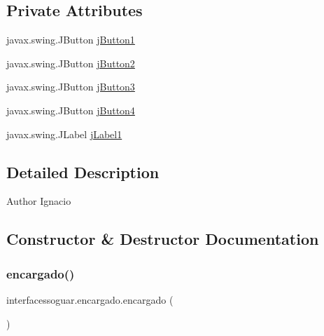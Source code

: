 \subsection*{Private Attributes}
\begin{DoxyCompactItemize}
\item 
javax.\+swing.\+J\+Button \mbox{\hyperlink{classinterfacessoguar_1_1encargado_a5c4a8d1db3281eae3c5b8f19262b20c3}{j\+Button1}}
\item 
javax.\+swing.\+J\+Button \mbox{\hyperlink{classinterfacessoguar_1_1encargado_a1f39888fb096cb2dd2e874f7e05f05b5}{j\+Button2}}
\item 
javax.\+swing.\+J\+Button \mbox{\hyperlink{classinterfacessoguar_1_1encargado_a44f99cceb2a2d736508b0249e1ad447e}{j\+Button3}}
\item 
javax.\+swing.\+J\+Button \mbox{\hyperlink{classinterfacessoguar_1_1encargado_ada21ea49d21b7b6bdd43b2a7c584450d}{j\+Button4}}
\item 
javax.\+swing.\+J\+Label \mbox{\hyperlink{classinterfacessoguar_1_1encargado_a1b1ad6a8d2b52a465c2daf3b4409c9ed}{j\+Label1}}
\end{DoxyCompactItemize}


\subsection{Detailed Description}
\begin{DoxyAuthor}{Author}
Ignacio 
\end{DoxyAuthor}


\subsection{Constructor \& Destructor Documentation}
\mbox{\label{classinterfacessoguar_1_1encargado_a7ddc5de97eb0929c44ecc46246a58a32}} 
\subsubsection{\texorpdfstring{encargado()}{encargado()}}
{\footnotesize\ttfamily interfacessoguar.\+encargado.\+encargado (\begin{DoxyParamCaption}{ }\end{DoxyParamCaption})\hspace{0.3cm}{\ttfamily [inline]}}

